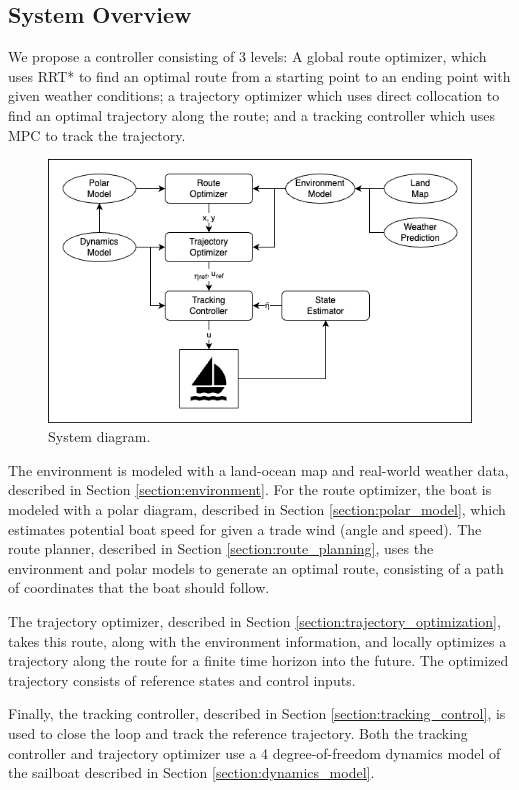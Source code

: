\documentclass[conference]{IEEEtran}
\begin{document}
\subsection{System Overview}
We propose a controller consisting of 3 levels: A global route optimizer, which uses RRT* to find an optimal route from a starting point to an ending point with given weather conditions; a trajectory optimizer which uses direct collocation to find an optimal trajectory along the route; and a tracking controller which uses MPC to track the trajectory.

\begin{figure}[ht]
    \centering
    \includegraphics[width=.9\columnwidth]{fig/system_diagram.png}
    \caption{System diagram.}
    \label{fig:system_diagram}
\end{figure}

The environment is modeled with a land-ocean map and real-world weather data, described in Section \ref{section:environment}. For the route optimizer, the boat is modeled with a polar diagram, described in Section \ref{section:polar_model}, which estimates potential boat speed for given a trade wind (angle and speed). The route planner, described in Section \ref{section:route_planning}, uses the environment and polar models to generate an optimal route, consisting of a path of coordinates that the boat should follow.

The trajectory optimizer, described in Section \ref{section:trajectory_optimization}, takes this route, along with the environment information, and locally optimizes a trajectory along the route for a finite time horizon into the future. The optimized trajectory consists of reference states and control inputs.

Finally, the tracking controller, described in Section \ref{section:tracking_control}, is used to close the loop and track the reference trajectory. Both the tracking controller and trajectory optimizer use a 4 degree-of-freedom dynamics model of the sailboat described in Section \ref{section:dynamics_model}.
\end{document}
